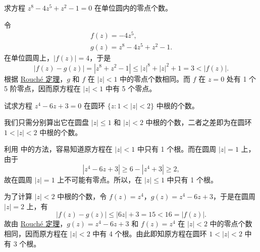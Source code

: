 \documentclass[../../main.tex]{subfiles}%
\begin{document}
\begin{example}\label{example:例4.4.12}
求方程 \( z^8 - 4z^5 + z^2 - 1 = 0 \) 在单位圆内的零点个数。
\end{example}
\begin{solution}
令
\begin{gather*}
f(z) = -4z^5,
\\
g(z) = z^8 - 4z^5 + z^2 - 1.
\end{gather*}
在单位圆周上，\( |f(z)| = 4 \)，于是
\[
|f(z) - g(z)| = |z^8 + z^2 - 1| \leqslant  |z|^8 + |z|^2 + 1 = 3 < |f(z)|.
\]
根据 \hyperref[theorem:Rouché定理-定理4.4.3]{Rouché 定理}，\( g \) 和 \( f \) 在 \( |z| < 1 \) 中的零点个数相同。而 \( f \) 在 \( z = 0 \) 处有 1 个 5 阶零点，因而原方程在 \( |z| < 1 \) 中有 5 个零点。 

\end{solution}

\begin{example}
试求方程 \( z^4 - 6z + 3 = 0 \) 在圆环 \( \{ z : 1 < |z| < 2 \} \) 中根的个数。
\end{example}
\begin{solution}
我们只需分别算出它在圆盘 \( |z| \leqslant  1 \) 和 \( |z| < 2 \) 中根的个数，二者之差即为在圆环 \( 1 < |z| < 2 \) 中根的个数。

利用 中的方法，容易知道原方程在 \( |z| < 1 \) 中只有 1 个根。而在圆周 \( |z| = 1 \) 上，由于
\[
|z^4 - 6z + 3| \geqslant  6 - |z^4 + 3| \geqslant  2,
\]
故在圆周 \( |z| = 1 \) 上不可能有零点。所以，在 \( |z| \leqslant  1 \) 中只有 1 个根。

为了计算 \( |z| < 2 \) 中根的个数，令 \( f(z) = z^4 \)，\( g(z) = z^4 - 6z + 3 \)，于是在圆周 \( |z| = 2 \) 上，有
\[
|f(z) - g(z)| \leqslant  |6z| + 3 = 15 < 16 = |f(z)|.
\]
故由 \hyperref[theorem:Rouché定理-定理4.4.3]{Rouché 定理}，\( g(z) = z^4 - 6z + 3 \) 和 \( f(z) = z^4 \) 在 \( |z| < 2 \) 中的零点个数相同，因而原方程在 \( |z| < 2 \) 中有 4 个根。由此即知原方程在圆环 \( 1 < |z| < 2 \) 中有 3 个根。 

\end{solution}
\end{document}

